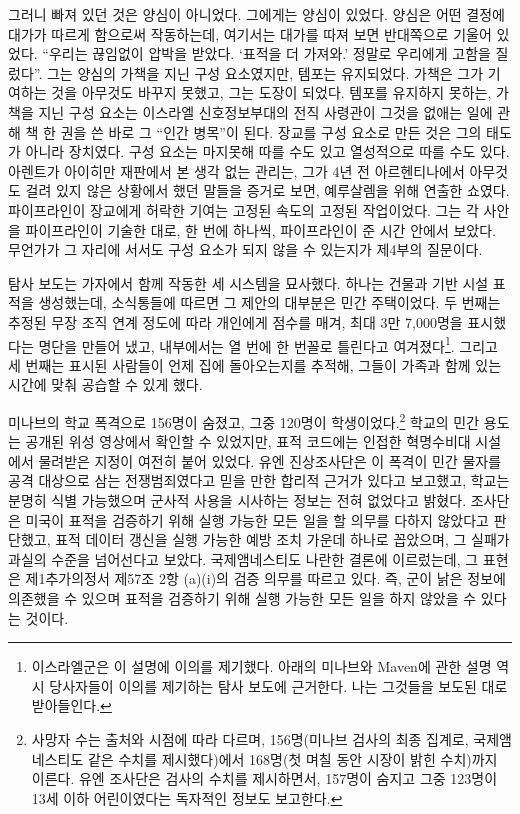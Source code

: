 그러니 빠져 있던 것은 양심이 아니었다. 그에게는 양심이 있었다. 양심은 어떤 결정에 대가가 따르게 함으로써 작동하는데, 여기서는 대가를 따져 보면 반대쪽으로 기울어 있었다. “우리는 끊임없이 압박을 받았다. ‘표적을 더 가져와.’ 정말로 우리에게 고함을 질렀다”\autocite{abraham2024lavender}. 그는 양심의 가책을 지닌 구성 요소였지만, 템포는 유지되었다. 가책은 그가 기여하는 것을 아무것도 바꾸지 못했고, 그는 도장이 되었다. 템포를 유지하지 못하는, 가책을 지닌 구성 요소는 이스라엘 신호정보부대의 전직 사령관이 그것을 없애는 일에 관해 책 한 권을 쓴 바로 그 “인간 병목”이 된다\autocite{ys2021humanmachine}. 장교를 구성 요소로 만든 것은 그의 태도가 아니라 장치였다. 구성 요소는 마지못해 따를 수도 있고 열성적으로 따를 수도 있다. 아렌트가 아이히만 재판에서 본 생각 없는 관리\autocite{arendt1963eichmann}는, 그가 4년 전 아르헨티나에서 아무것도 걸려 있지 않은 상황에서 했던 말들을 증거로 보면, 예루살렘을 위해 연출한 쇼였다\autocite{stangneth2014eichmann}. 파이프라인이 장교에게 허락한 기여는 고정된 속도의 고정된 작업이었다. 그는 각 사안을 파이프라인이 기술한 대로, 한 번에 하나씩, 파이프라인이 준 시간 안에서 보았다. 무언가가 그 자리에 서서도 구성 요소가 되지 않을 수 있는지가 제4부의 질문이다.

탐사 보도는 가자에서 함께 작동한 세 시스템을 묘사했다. 하나는 건물과 기반 시설 표적을 생성했는데, 소식통들에 따르면 그 제안의 대부분은 민간 주택이었다. 두 번째는 추정된 무장 조직 연계 정도에 따라 개인에게 점수를 매겨, 최대 3만 7,000명을 표시했다는 명단을 만들어 냈고, 내부에서는 열 번에 한 번꼴로 틀린다고 여겨졌다\footnote{이스라엘군은 이 설명에 이의를 제기했다. 아래의 미나브와 Maven에 관한 설명 역시 당사자들이 이의를 제기하는 탐사 보도에 근거한다. 나는 그것들을 보도된 대로 받아들인다.}. 그리고 세 번째는 표시된 사람들이 언제 집에 돌아오는지를 추적해, 그들이 가족과 함께 있는 시간에 맞춰 공습할 수 있게 했다.


미나브의 학교 폭격으로 156명이 숨졌고, 그중 120명이 학생이었다\autocite[제92항]{UNFFMIran2026}.\footnote{사망자 수는 출처와 시점에 따라 다르며, 156명(미나브 검사의 최종 집계로, 국제앰네스티도 같은 수치를 제시했다)에서 168명(첫 며칠 동안 시장이 밝힌 수치)까지 이른다. 유엔 조사단은 검사의 수치를 제시하면서, 157명이 숨지고 그중 123명이 13세 이하 어린이였다는 독자적인 정보도 보고한다\autocite[제92–93항]{UNFFMIran2026}.} 학교의 민간 용도는 공개된 위성 영상에서 확인할 수 있었지만, 표적 코드에는 인접한 혁명수비대 시설에서 물려받은 지정이 여전히 붙어 있었다. 유엔 진상조사단은 이 폭격이 민간 물자를 공격 대상으로 삼는 전쟁범죄였다고 믿을 만한 합리적 근거가 있다고 보고했고\autocite{ohchr2026minabpress}, 학교는 분명히 식별 가능했으며 군사적 사용을 시사하는 정보는 전혀 없었다고 밝혔다\autocite[제81–86항, 제124–126항]{UNFFMIran2026}. 조사단은 미국이 표적을 검증하기 위해 실행 가능한 모든 일을 할 의무를 다하지 않았다고 판단했고, 표적 데이터 갱신을 실행 가능한 예방 조치 가운데 하나로 꼽았으며, 그 실패가 과실의 수준을 넘어선다고 보았다\autocite[제124–125항]{UNFFMIran2026}. 국제앰네스티도 나란한 결론에 이르렀는데, 그 표현은 제1추가의정서 제57조 2항 (a)(i)의 검증 의무를 따르고 있다. 즉, 군이 낡은 정보에 의존했을 수 있으며 표적을 검증하기 위해 실행 가능한 모든 일을 하지 않았을 수 있다는 것이다\autocite{Amnesty2026Minab}.

